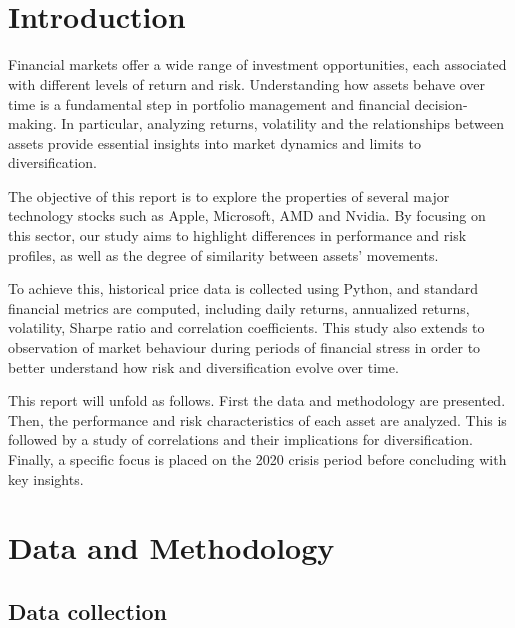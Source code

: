 \documentclass{article}
\title{
    \vspace{2in}
    \textmd{\textbf{\hmwkClass\ \hmwkTitle}}\\
    \vspace{0.1in}\large{\textit{\hmwkClassInstructor}}
    \vspace{3in}
}
\author{\hmwkAuthorName}
\date{}
\begin{document}
\maketitle

\pagebreak

\tableofcontents

\pagebreak

\section{Introduction}

Financial markets offer a wide range of investment opportunities, each associated with different levels of return and risk. Understanding how assets behave over time is a fundamental step in portfolio management and financial decision-making. In particular, analyzing returns, volatility and the relationships between assets provide essential insights into market dynamics and limits to diversification.
\vspace{0.3cm}

The objective of this report is to explore the properties of several major technology stocks such as Apple, Microsoft, AMD and Nvidia. By focusing on this sector, our study aims to highlight differences in performance and risk profiles, as well as the degree of similarity between assets' movements.
\vspace{0.3cm}

To achieve this, historical price data is collected using Python, and standard financial metrics are computed, including daily returns, annualized returns, volatility, Sharpe ratio and correlation coefficients. This study also extends to observation of market behaviour during periods of financial stress in order to better understand how risk and diversification evolve over time.
\vspace{0.3cm}

This report will unfold as follows. First the data and methodology are presented. Then, the performance and risk characteristics of each asset are analyzed. This is followed by a study of correlations and their implications for diversification. Finally, a specific focus is placed on the 2020 crisis period before concluding with key insights.


\section{Data and Methodology}

\subsection{Data collection}
\end{document}
